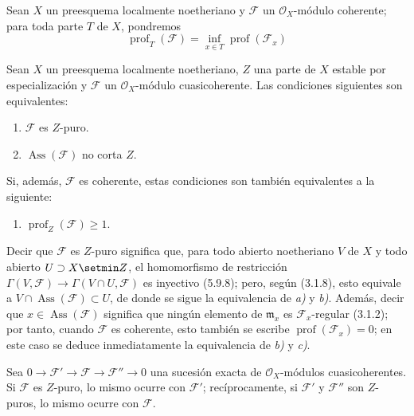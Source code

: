 \begin{env}[5.10.1]
\label{IV.2.s5.10.1-fr}
Sean $X$ un preesquema localmente noetheriano y $\mathcal F$ un
$\mathcal O_X$-módulo coherente; para toda parte $T$ de $X$, pondremos
\begin{equation}
\operatorname{prof}_T(\mathcal F)
=\inf_{x\in T}\operatorname{prof}(\mathcal F_x)
\tag{5.10.1.1}\label{IV.2.s5.10.1.1-fr}
\end{equation}
\end{env}

\begin{proposition}[5.10.2]
Sean $X$ un preesquema localmente noetheriano, $Z$ una parte de $X$ estable
por especialización y $\mathcal F$ un $\mathcal O_X$-módulo cuasicoherente.
Las condiciones siguientes son equivalentes:
\begin{enumerate}
\item[\textup{a)}] $\mathcal F$ es $Z$-puro.
\item[\textup{b)}] $\operatorname{Ass}(\mathcal F)$ no corta $Z$.
\end{enumerate}
Si, además, $\mathcal F$ es coherente, estas condiciones son también
equivalentes a la siguiente:
\begin{enumerate}
\item[\textup{c)}] $\operatorname{prof}_Z(\mathcal F)\geq1$.
\end{enumerate}
\end{proposition}

Decir que $\mathcal F$ es $Z$-puro significa que, para todo abierto
noetheriano $V$ de $X$ y todo abierto $U\supset X\setmin Z$, el homomorfismo de
restricción
$\Gamma(V,\mathcal F)\longrightarrow\Gamma(V\cap U,\mathcal F)$
es inyectivo (5.9.8); pero, según (3.1.8), esto equivale a
$V\cap\operatorname{Ass}(\mathcal F)\subset U$, de donde se sigue la
equivalencia de \emph{a)} y \emph{b)}. Además, decir que
$x\in\operatorname{Ass}(\mathcal F)$ significa que ningún elemento de
$\mathfrak m_x$ es $\mathcal F_x$-regular (3.1.2); por tanto, cuando
$\mathcal F$ es coherente, esto también se escribe
$\operatorname{prof}(\mathcal F_x)=0$; en este caso se deduce inmediatamente
la equivalencia de \emph{b)} y \emph{c)}.

\begin{corollary}[5.10.3]
\label{IV.2.s5.10.3-fr}
Sea
$0\longrightarrow\mathcal F'\longrightarrow\mathcal F
\longrightarrow\mathcal F''\longrightarrow0$
una sucesión exacta de $\mathcal O_X$-módulos cuasicoherentes. Si
$\mathcal F$ es $Z$-puro, lo mismo ocurre con $\mathcal F'$; recíprocamente,
si $\mathcal F'$ y $\mathcal F''$ son $Z$-puros, lo mismo ocurre con
$\mathcal F$.
\end{corollary}

